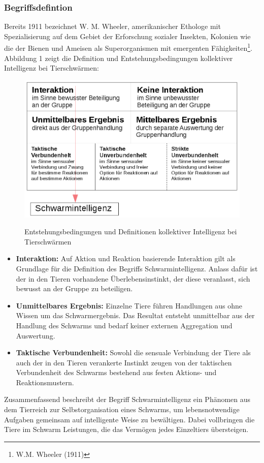 \documentclass[a4paper, 11pt]{article}
\begin{document}
\subsubsection{Begriffsdefintion}
Bereits 1911 bezeichnet W. M. Wheeler, amerikanischer Ethologe mit Spezialisierung auf dem Gebiet der Erforschung sozialer Insekten, Kolonien wie die der Bienen und Ameisen als Superorganismen mit emergenten Fähigkeiten\footnote{W.M. Wheeler (1911)}. Abbildung 1 zeigt die Definition und Entstehungsbedingungen kollektiver Intelligenz bei Tierschwärmen:\newline
\begin{figure}[h]
	\begin{center}
	\includegraphics[width=1\textwidth]{schwarmintelligenz}
		\label{defabb}
	\end{center}
	\hspace{1in}\parbox{4in}{\caption[Entstehungsbedingungen und Definitionen kollektiver Intelligenz bei Tierschwärmen]{Entstehungsbedingungen und Definitionen kollektiver Intelligenz bei Tierschwärmen\footnotemark}}
\end{figure}
\begin{itemize}
	\item \textbf{Interaktion:} Auf Aktion und Reaktion basierende Interaktion gilt als Grundlage für die Definition des Begriffs Schwarmintelligenz. Anlass dafür ist der in den Tieren vorhandene Überlebensinstinkt, der diese veranlasst, sich bewusst an der Gruppe zu beteiligen.
	\item \textbf{Unmittelbares Ergebnis:} Einzelne Tiere führen Handlungen aus ohne Wissen um das Schwarmergebnis. Das Resultat entsteht unmittelbar aus der Handlung des Schwarms und bedarf keiner externen Aggregation und Auswertung.
	\item \textbf{Taktische Verbundenheit:} Sowohl die sensuale Verbindung der Tiere als auch der in den Tieren verankerte Instinkt zeugen von der taktischen Verbundenheit des Schwarms bestehend aus festen Aktions- und Reaktionsmustern. 
\end{itemize}
\par Zusammenfassend beschreibt der Begriff Schwarmintelligenz ein Phänomen aus dem Tierreich zur Selbstorganisation eines Schwarms, um lebensnotwendige Aufgaben gemeinsam auf intelligente Weise zu bewältigen. Dabei vollbringen die Tiere im Schwarm Leistungen, die das Vermögen jedes Einzeltiers übersteigen.
\end{document}
